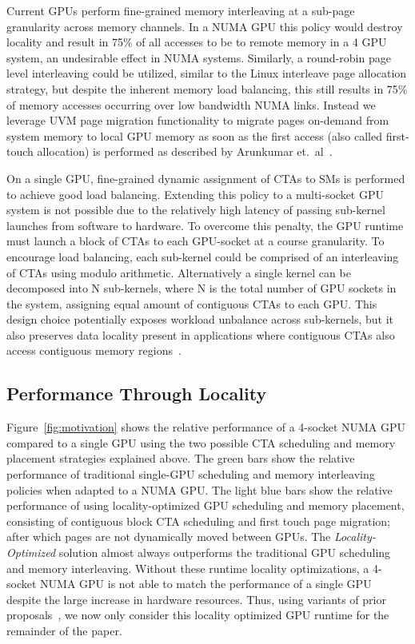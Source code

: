 Current GPUs perform fine-grained memory interleaving at a sub-page granularity 
across memory channels.  In a NUMA GPU this policy would destroy locality and 
result in 75\% of all accesses to be to remote memory in a 4 GPU system, an 
undesirable effect in NUMA systems.  Similarly, a round-robin page level 
interleaving could be utilized, similar to the Linux interleave page allocation 
strategy, but despite the inherent memory load balancing, this still results in 
75\% of memory accesses occurring over low bandwidth NUMA links. Instead we 
leverage UVM page migration functionality to migrate pages on-demand from system 
memory to local GPU memory as soon as the first access (also called first-touch 
allocation) is performed as described by Arunkumar et.~al~\cite{Arunkumar2017}.

On a single GPU, fine-grained dynamic assignment of CTAs to SMs is performed to 
achieve good load balancing.  Extending this policy to a multi-socket GPU 
system is not possible due to the relatively high latency of passing sub-kernel 
launches from software to hardware.  To overcome this penalty, the GPU runtime 
must launch a block of CTAs to each GPU-socket at a course granularity.  To 
encourage load balancing, each sub-kernel could be comprised of an interleaving 
of CTAs using modulo arithmetic.  Alternatively a single kernel can be 
decomposed into N sub-kernels, where N is the total number of GPU sockets in 
the system, assigning equal amount of contiguous CTAs to each GPU.  This design 
choice potentially exposes workload unbalance across sub-kernels, but it also preserves data locality present in applications where contiguous 
CTAs also access contiguous memory regions~\cite{Cabezas2015,Arunkumar2017}.

\vspace{-.1in}
\subsection{Performance Through Locality} 

Figure~\ref{fig:motivation} shows the relative performance of a 4-socket NUMA 
GPU compared to a single GPU using the two possible CTA scheduling and 
memory placement strategies explained above.  The green bars show the 
relative performance of traditional single-GPU scheduling and memory 
interleaving policies when adapted to a NUMA GPU. The light blue bars
show the relative performance of using locality-optimized GPU scheduling and 
memory placement, consisting of contiguous block CTA scheduling and first touch 
page migration; after which pages are not dynamically moved between GPUs. 
The \textit{Locality-Optimized} 
solution almost always outperforms the traditional GPU scheduling and memory 
interleaving.  Without these runtime locality optimizations, a 4-socket NUMA 
GPU is not able to match the performance of a single GPU despite the large 
increase in hardware resources.  Thus, using variants of prior 
proposals~\cite{Cabezas2015,Arunkumar2017}, we now only consider this locality 
optimized GPU runtime for the remainder of the paper.

